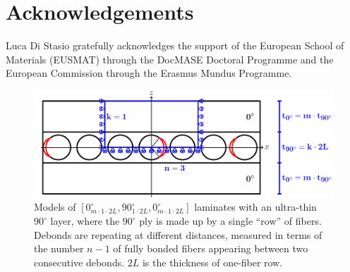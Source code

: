 \documentclass[review]{elsarticle}
\begin{document}

\section*{Acknowledgements}

Luca Di Stasio gratefully acknowledges the support of the European School of Materials (EUSMAT) through the DocMASE Doctoral Programme and the European Commission through the Erasmus Mundus Programme.




\newpage

\begin{figure}[!htb]
\centering
  \includegraphics[height=0.225\textheight]{thinPly.pdf}
\caption{Models of $\left[0_{m\cdot 1\cdot2L}^{\circ},90_{1\cdot2L}^{\circ},0_{m\cdot 1\cdot2L}^{\circ}\right]$ laminates with an ultra-thin $90^{\circ}$ layer, where the $90^{\circ}$ ply is made up by a single ``row'' of fibers. Debonds are repeating at different distances, measured in terms of the number $n-1$ of fully bonded fibers appearing between two consecutive debonds. $2L$ is the thickness of one-fiber row.}\label{fig:laminateModelsA}
\end{figure}
\end{document}
